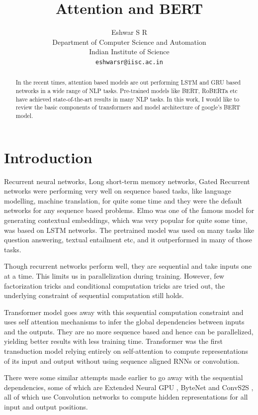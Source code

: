 \documentclass{article}
\title{Attention and BERT}
\author{%
  Eshwar S R \\
  Department of Computer Science and Automation\\
  Indian Institute of Science\\
  \texttt{eshwarsr@iisc.ac.in} \\
}
\begin{document}
\maketitle

\begin{abstract}
  In the recent times, attention based models are out performing LSTM and GRU based networks in a wide range of NLP tasks. Pre-trained models like BERT, RoBERTa etc have achieved state-of-the-art results in many NLP tasks. In this work, I would like to review the basic components of transformers and model architecture of google's BERT model. 
\end{abstract}

\section{Introduction}

Recurrent neural networks, Long short-term memory networks, Gated Recurrent networks were performing very well on sequence based tasks, like language modelling, machine translation, for quite some time and they were the default networks for any sequence based problems. Elmo \cite{peters-etal-2018-deep} was one of the famous model for generating contextual embeddings, which was very popular for quite some time, was based on LSTM networks. The pretrained model was used on many tasks like question answering, textual entailment etc, and it outperformed in many of those tasks. 

Though recurrent networks perform well, they are sequential and take inputs one at a time. This limits us in parallelization during training. However, few factorization tricks \cite{DBLP:journals/corr/KuchaievG17} and conditional computation \cite{NIPS2016_6295} tricks are tried out, the underlying constraint of sequential computation still holds. 

Transformer \cite{vaswani2017attention} model goes away with this sequential computation constraint and uses self attention mechanisms to infer the global dependencies between inputs and the outputs. They are no more sequence based and hence can be parallelized, yielding better results with less training time. Transformer was the first transduction model relying entirely on self-attention to compute representations of its input and output without using sequence aligned RNNs or convolution.

There were some similar attempts made earlier to go away with the sequential dependencies, some of which are Extended Neural GPU \cite{NIPS2016_6295}, ByteNet \cite{DBLP:journals/corr/KalchbrennerESO16} and ConvS2S \cite{DBLP:journals/corr/GehringAGYD17}, all of which use Convolution networks to compute hidden representations for all input and output positions.
\end{document}
